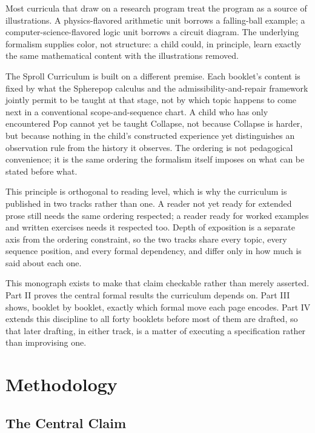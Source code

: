 \documentclass[11pt,twoside]{book}
\begin{document}
Most curricula that draw on a research program treat the program as a source of illustrations. A physics-flavored arithmetic unit borrows a falling-ball example; a computer-science-flavored logic unit borrows a circuit diagram. The underlying formalism supplies color, not structure: a child could, in principle, learn exactly the same mathematical content with the illustrations removed.

The Sproll Curriculum is built on a different premise. Each booklet's content is fixed by what the Spherepop calculus and the admissibility-and-repair framework jointly permit to be taught at that stage, not by which topic happens to come next in a conventional scope-and-sequence chart. A child who has only encountered Pop cannot yet be taught Collapse, not because Collapse is harder, but because nothing in the child's constructed experience yet distinguishes an observation rule from the history it observes. The ordering is not pedagogical convenience; it is the same ordering the formalism itself imposes on what can be stated before what.

This principle is orthogonal to reading level, which is why the curriculum is published in two tracks rather than one. A reader not yet ready for extended prose still needs the same ordering respected; a reader ready for worked examples and written exercises needs it respected too. Depth of exposition is a separate axis from the ordering constraint, so the two tracks share every topic, every sequence position, and every formal dependency, and differ only in how much is said about each one.

This monograph exists to make that claim checkable rather than merely asserted. Part II proves the central formal results the curriculum depends on. Part III shows, booklet by booklet, exactly which formal move each page encodes. Part IV extends this discipline to all forty booklets before most of them are drafted, so that later drafting, in either track, is a matter of executing a specification rather than improvising one.

\mainmatter

\part{Methodology}

\chapter{The Central Claim}
\end{document}
